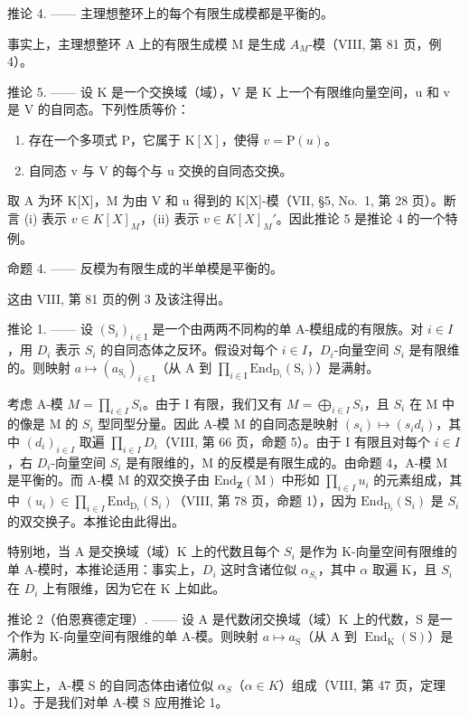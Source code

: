推论 4. —— 主理想整环上的每个有限生成模都是平衡的。

事实上，主理想整环 A 上的有限生成模 M 是生成 \(A_{M}\)-模（VIII, 第 81 页，例 4）。

推论 5. —— 设 K 是一个交换域（域），V 是 K 上一个有限维向量空间，u 和 v 是 V 的自同态。下列性质等价：

\begin{enumerate}
\def\labelenumi{(\roman{enumi})}
\item
  存在一个多项式 \(\mathrm{P}\)，它属于 \(\mathrm{K}[\mathrm{X}]\)，使得 \(v = \mathrm{P}(u)\)。
\item
  自同态 v 与 V 的每个与 u 交换的自同态交换。
\end{enumerate}

取 A 为环 K{[}X{]}，M 为由 V 和 u 得到的 K{[}X{]}-模（VII, §5, No.~1, 第 28 页）。断言 (i) 表示 \(v \in K[X]_{M}\)，(ii) 表示 \(v \in K[X]_{M}'\)。因此推论 5 是推论 4 的一个特例。

命题 4. —— 反模为有限生成的半单模是平衡的。

这由 VIII, 第 81 页的例 3 及该注得出。

推论 1. —— 设 \((\mathrm{S}_{i})_{i\in\mathrm{I}}\) 是一个由两两不同构的单 A-模组成的有限族。对 \(i\in I\)，用 \(D_{i}\) 表示 \(S_{i}\) 的自同态体之反环。假设对每个 \(i\in I\)，\(D_{i}\)-向量空间 \(S_{i}\) 是有限维的。则映射 \(a \mapsto (a_{\mathrm{S}_i})_{i \in \mathrm{I}}\)（从 A 到 \(\prod_{i \in \mathrm{I}} \mathrm{End}_{\mathrm{D}_i}(\mathrm{S}_i)\)）是满射。

考虑 A-模 \(M = \prod_{i \in I} S_i\)。由于 I 有限，我们又有 \(M = \bigoplus_{i \in I} S_i\)，且 \(S_i\) 在 M 中的像是 M 的 \(S_i\) 型同型分量。因此 A-模 M 的自同态是映射 \((s_i) \mapsto (s_i d_i)\)，其中 \((d_i)_{i \in I}\) 取遍 \(\prod_{i \in I} D_i\)（VIII, 第 66 页，命题 5）。由于 I 有限且对每个 \(i \in I\)，右 \(D_i\)-向量空间 \(S_i\) 是有限维的，M 的反模是有限生成的。由命题 4，A-模 M 是平衡的。而 A-模 M 的双交换子由 \(\text{End}_{\mathbf{Z}}(\text{M})\) 中形如 \(\prod_{i \in I} u_i\) 的元素组成，其中 \((u_i) \in \prod_{i \in I} \text{End}_{\text{D}_i}(\text{S}_i)\)（VIII, 第 78 页，命题 1），因为 \(\text{End}_{\text{D}_i}(\text{S}_i)\) 是 \(S_i\) 的双交换子。本推论由此得出。

特别地，当 A 是交换域（域）K 上的代数且每个 \(S_{i}\) 是作为 K-向量空间有限维的单 A-模时，本推论适用：事实上，\(D_{i}\) 这时含诸位似 \(\alpha_{S_{i}}\)，其中 \(\alpha\) 取遍 K，且 \(S_{i}\) 在 \(D_{i}\) 上有限维，因为它在 K 上如此。

推论 2（伯恩赛德定理）. —— 设 A 是代数闭交换域（域）K 上的代数，S 是一个作为 K-向量空间有限维的单 A-模。则映射 \(a \mapsto a_{\mathrm{S}}\)（从 A 到 \(\operatorname{End}_{\mathrm{K}}(\mathrm{S})\)）是满射。

事实上，A-模 S 的自同态体由诸位似 \(\alpha_{S}\)（\(\alpha \in K\)）组成（VIII, 第 47 页，定理 1）。于是我们对单 A-模 S 应用推论 1。

